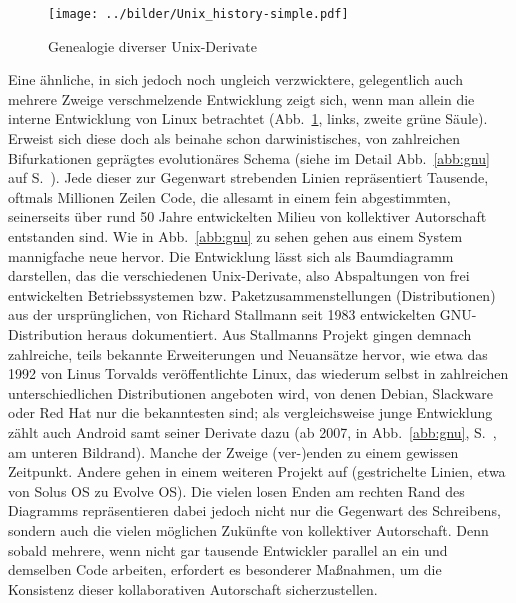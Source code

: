 \documentclass[a4paper,10pt]{article}
\begin{document}
\begin{figure}[ht]
\begin{center}
\texttt{[image: ../bilder/Unix\_history-simple.pdf]}\\[-3mm]
\caption{Genealogie diverser Unix-Derivate}\label{abb:unix}
\end{center}
\end{figure}

Eine ähnliche, in sich jedoch noch ungleich verzwicktere, gelegentlich auch mehrere Zweige verschmelzende Entwicklung zeigt sich, wenn man allein die interne Entwicklung von Linux betrachtet (Abb.~\ref{abb:unix}, links, zweite grüne Säule). Erweist sich diese doch als beinahe schon darwinistisches, von zahlreichen Bifurkationen geprägtes evolutionäres Schema  (siehe im Detail Abb.~\ref{abb:gnu} auf S.~\pageref{toc:gnu}). Jede dieser zur Gegenwart strebenden Linien repräsentiert Tausende, oftmals Millionen Zeilen Code, die allesamt in einem fein abgestimmten, seinerseits über rund 50 Jahre entwickelten Milieu von kollektiver Autorschaft entstanden sind. Wie in Abb.~\ref{abb:gnu} zu sehen gehen aus einem System mannigfache neue hervor. Die Entwicklung lässt sich als Baumdiagramm darstellen, das die verschiedenen Unix-Derivate, also Abspaltungen von frei entwickelten Betriebssystemen bzw. Paketzusammenstellungen (Distributionen) aus der ursprünglichen, von Richard Stallmann seit 1983 entwickelten GNU-Distribution heraus dokumentiert. Aus Stallmanns Projekt gingen demnach zahlreiche, teils bekannte Erweiterungen und Neuansätze hervor, wie etwa das 1992 von Linus Torvalds veröffentlichte Linux, das wiederum selbst in zahlreichen unterschiedlichen Distributionen angeboten wird, von denen Debian, Slackware oder Red Hat nur die bekanntesten sind; als vergleichsweise junge Entwicklung zählt auch Android samt seiner Derivate dazu (ab 2007, in Abb.~\ref{abb:gnu}, S.~\pageref{abb:gnu}, am unteren Bildrand). Manche der Zweige (ver-)enden zu einem gewissen Zeitpunkt. Andere gehen in einem weiteren Projekt auf (gestrichelte Linien, etwa von Solus OS zu Evolve OS). Die vielen losen Enden am rechten Rand des Diagramms repräsentieren dabei jedoch nicht nur die Gegenwart des Schreibens, sondern auch die vielen möglichen Zukünfte von kollektiver Autorschaft. Denn sobald mehrere, wenn nicht gar tausende Entwickler parallel an ein und demselben Code arbeiten, erfordert es besonderer Maßnahmen, um die Konsistenz dieser kollaborativen Autorschaft sicherzustellen. 
\end{document}
